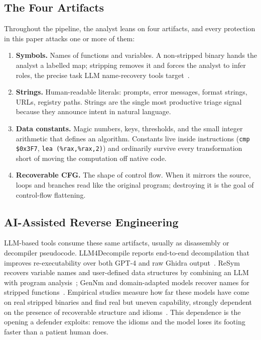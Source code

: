 \documentclass[conference]{IEEEtran}
\begin{document}
\subsection{The Four Artifacts}
Throughout the pipeline, the analyst leans on four artifacts, and every
protection in this paper attacks one or more of them:
\begin{enumerate}
\item \textbf{Symbols.} Names of functions and variables. A non-stripped binary
hands the analyst a labelled map; stripping removes it and forces the analyst to
infer roles, the precise task LLM name-recovery tools target~\cite{gennm,funcname}.
\item \textbf{Strings.} Human-readable literals: prompts, error messages, format
strings, URLs, registry paths. Strings are the single most productive triage
signal because they announce intent in natural language.
\item \textbf{Data constants.} Magic numbers, keys, thresholds, and the small
integer arithmetic that defines an algorithm. Constants live inside instructions
(\texttt{cmp \$0x3F7}, \texttt{lea (\%rax,\%rax,2)}) and ordinarily survive every
transformation short of moving the computation off native code.
\item \textbf{Recoverable CFG.} The shape of control flow. When it mirrors the
source, loops and branches read like the original program; destroying it is the
goal of control-flow flattening.
\end{enumerate}

\subsection{AI-Assisted Reverse Engineering}
LLM-based tools consume these same artifacts, usually as disassembly or decompiler
pseudocode. LLM4Decompile reports end-to-end decompilation that improves
re-executability over both GPT-4 and raw Ghidra output~\cite{llm4decompile}.
ReSym recovers variable names and user-defined data structures by combining an
LLM with program analysis~\cite{resym}; GenNm and domain-adapted models recover
names for stripped functions~\cite{gennm,funcname}. Empirical studies measure how
far these models have come on real stripped binaries and find real but uneven
capability, strongly dependent on the presence of recoverable structure and
idioms~\cite{howfar,empirical}. This dependence is the opening a defender
exploits: remove the idioms and the model loses its footing faster than a patient
human does.
\end{document}
